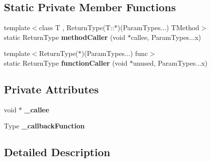 \subsection*{Static Private Member Functions}
\begin{DoxyCompactItemize}
\item 
{\footnotesize template$<$class T , Return\+Type(\+T\+::$\ast$)(\+Param\+Types...) T\+Method$>$ }\\static Return\+Type {\bfseries method\+Caller} (void $\ast$callee, Param\+Types...\+x)\hypertarget{class_ensum_1_1_delegate_3_01_return_type_07_param_types_8_8_8_08_4_ad80559b29464429d6c5b154dafc8a55f}{}\label{class_ensum_1_1_delegate_3_01_return_type_07_param_types_8_8_8_08_4_ad80559b29464429d6c5b154dafc8a55f}

\item 
{\footnotesize template$<$Return\+Type($\ast$)(\+Param\+Types...) func$>$ }\\static Return\+Type {\bfseries function\+Caller} (void $\ast$unused, Param\+Types...\+x)\hypertarget{class_ensum_1_1_delegate_3_01_return_type_07_param_types_8_8_8_08_4_a5f7d20d29a86b79fa56179802df350c3}{}\label{class_ensum_1_1_delegate_3_01_return_type_07_param_types_8_8_8_08_4_a5f7d20d29a86b79fa56179802df350c3}

\end{DoxyCompactItemize}
\subsection*{Private Attributes}
\begin{DoxyCompactItemize}
\item 
void $\ast$ {\bfseries \+\_\+callee}\hypertarget{class_ensum_1_1_delegate_3_01_return_type_07_param_types_8_8_8_08_4_a544eff1d37dad61b5d62520a967f9685}{}\label{class_ensum_1_1_delegate_3_01_return_type_07_param_types_8_8_8_08_4_a544eff1d37dad61b5d62520a967f9685}

\item 
Type {\bfseries \+\_\+callback\+Function}\hypertarget{class_ensum_1_1_delegate_3_01_return_type_07_param_types_8_8_8_08_4_a24614e76a613f902e377ddacaa4d74a7}{}\label{class_ensum_1_1_delegate_3_01_return_type_07_param_types_8_8_8_08_4_a24614e76a613f902e377ddacaa4d74a7}

\end{DoxyCompactItemize}


\subsection{Detailed Description}
